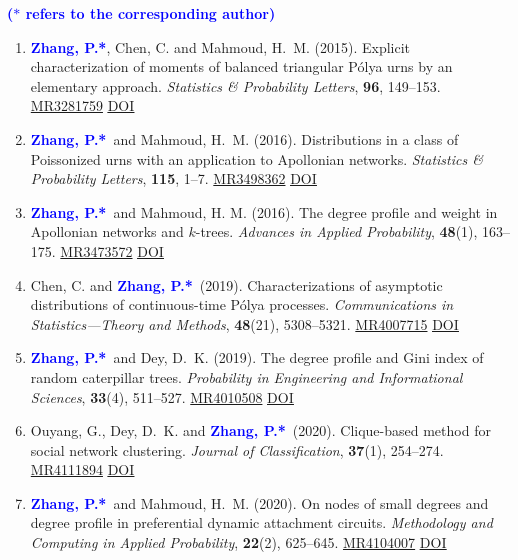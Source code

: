 \documentclass[12pt]{article}
\def\MR#1{\href{http://www.ams.org/mathscinet-getitem?mr=#1}{MR#1}}
\newcommand{\PZ}{\textcolor{blue}{\textbf{Zhang, P.*}}}
\begin{document}
	{\bf \textcolor{blue}{($\ast$ refers to the corresponding author)}}
	
	\noindent {\bf \textcolor{brown}{($\dagger$ refers to my 
	students, postdocs or trainees)}}
	
	\begin{enumerate}
		\item \PZ, {\sc Chen, C.} and {\sc Mahmoud, H.\ M.} 
		(2015). Explicit characterization of moments of balanced 
		triangular P\'{o}lya urns by an elementary approach. 
		\emph{Statistics \& Probability Letters}, {\bf 96}, 149--153. \MR{3281759} \href{https://doi.org/10.1016/j.spl.2014.09.016}
		{\underline{DOI}}
		
		\item \PZ\ and {\sc Mahmoud, H.\ M.} (2016). 
		Distributions in a class of Poissonized urns with an application to Apollonian networks. \emph{Statistics \& Probability Letters}, {\bf 115}, 1--7. \MR{3498362}
		\href{https://doi.org/10.1016/j.spl.2016.03.023}
		{\underline{DOI}}
		
		\item \PZ\ and {\sc Mahmoud, H. M.} (2016). The 
		degree profile and weight in Apollonian networks and $k$-trees. {\em Advances in Applied Probability}, \textbf{48}(1), 163--175. \MR{3473572}
		\href{https://doi.org/10.1017/apr.2015.11}
		{\underline{DOI}}
		
		\item {\sc Chen, C.} and \PZ\ (2019). Characterizations of 
		asymptotic distributions of continuous-time P\'{o}lya processes. {\em Communications in Statistics---Theory and Methods}, \textbf{48}(21), 5308--5321. \MR{4007715}
		\href{https://doi.org/10.1080/03610926.2018.1510005}
		{\underline{DOI}}
		
		\item \PZ\ and {\sc Dey, D.\ K.} (2019). The degree 
		profile and Gini index of random caterpillar trees. {\em 
		Probability in Engineering and Informational Sciences}, 
		\textbf{33}(4), 511--527. \MR{4010508}
		\href{https://doi.org/10.1017/S0269964818000475}
		{\underline{DOI}}
		
		\item {\sc Ouyang, G., Dey, D.\ K.} and \PZ\ (2020). 
		Clique-based method for social network clustering. {\em Journal of Classification}, \textbf{37}(1), 254--274. \MR{4111894} \href{https://doi.org/10.1007/s00357-019-9310-5}
		{\underline{DOI}}
		
		\item \PZ\ and {\sc Mahmoud, H.\ M.} (2020). On 
		nodes of small degrees and degree profile in preferential 
		dynamic attachment circuits. {\em Methodology and Computing in Applied Probability}, \textbf{22}(2), 625--645. \MR{4104007}
		\href{https://doi.org/10.1007/s11009-019-09726-4}
		{\underline{DOI}}
		

\end{enumerate}
\end{document}
